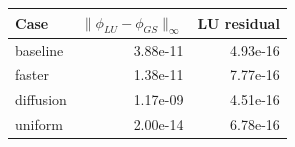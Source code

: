 \begin{tabular}{lrr}
\toprule
Case & $\|\phi_{LU}-\phi_{GS}\|_\infty$ & LU residual \\
\midrule
baseline & 3.88e-11 & 4.93e-16 \\
faster & 1.38e-11 & 7.77e-16 \\
diffusion & 1.17e-09 & 4.51e-16 \\
uniform & 2.00e-14 & 6.78e-16 \\
\bottomrule
\end{tabular}
